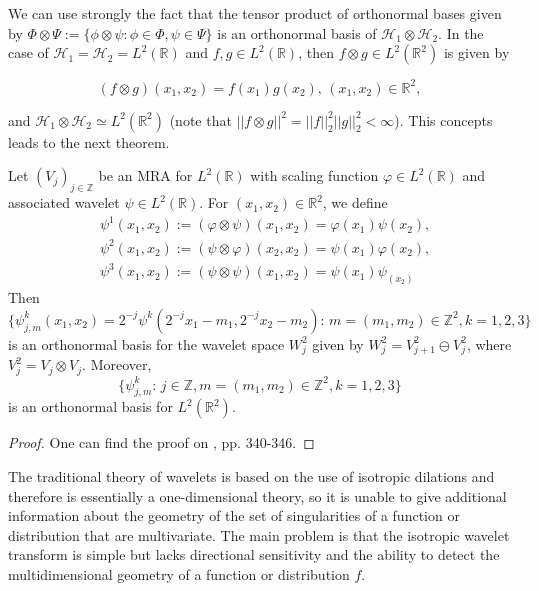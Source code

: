 \bigskip

We can use strongly the fact that the tensor product of orthonormal bases given by $\Phi\otimes\Psi:=\{\phi\otimes\psi:\phi\in\Phi,\psi\in\Psi\}$ is an orthonormal basis of $\mathcal{H}_1\otimes\mathcal{H}_2$. In the case of $\mathcal{H}_1=\mathcal{H}_2=L^2(\mathbb{R})$ and $f,g\in L^2(\mathbb{R})$, then $f\otimes g\in L^2(\mathbb{R}^2)$ is given by

$$
(f\otimes g)(x_1,x_2)=f(x_1)g(x_2)\text{,  } (x_1,x_2)\in\mathbb{R}^2,
$$

and $\mathcal{H}_1\otimes\mathcal{H}_2\simeq L^2(\mathbb{R}^2)$ (note that $||f\otimes g||^2=||f||_2^2||g||_2^2<\infty$). This concepts leads to the next theorem.

\bigskip

\begin{thm}
Let $(V_j)_{j\in\mathbb{Z}}$ be an MRA for $L^2(\mathbb{R})$ with scaling function $\varphi\in L^2(\mathbb{R})$ and associated wavelet $\psi\in L^2(\mathbb{R})$. For $(x_1,x_2)\in\mathbb{R}^2$, we define
$$
\begin{aligned}
&\psi^1(x_1,x_2):=(\varphi\otimes\psi)(x_1,x_2)=\varphi(x_1)\psi(x_2),\\
&\psi^2(x_1,x_2):=(\psi\otimes\varphi)(x_2,x_2)=\psi(x_1)\varphi(x_2),\\
&\psi^3(x_1,x_2):=(\psi\otimes\psi)(x_1,x_2)=\psi(x_1)\psi_(x_2)
\end{aligned}
$$
Then 
$$
\{\psi_{j,m}^k(x_1,x_2)=2^{-j}\psi^k(2^{-j}x_1-m_1,2^{-j}x_2-m_2)\text{: } m=(m_1,m_2)\in\mathbb{Z}^2,k=1,2,3\}
$$
is an orthonormal basis for the wavelet space $W^2_j$ given by $ W^2_j=V^2_{j+1}\ominus V^2_j$, where $V^2_j=V_j\otimes V_j$. Moreover,
$$
\{\psi_{j,m}^k\text{:  }j\in\mathbb{Z},m=(m_1,m_2)\in\mathbb{Z}^2,k=1,2,3\}
$$
is an orthonormal basis for $L^2(\mathbb{R}^2)$.
\end{thm}
\begin{proof}
One can find the proof on \cite{Mallat}, pp. 340-346.
\end{proof}

\bigskip

The traditional theory of wavelets is based on the use of isotropic dilations and therefore is essentially a one-dimensional theory, so it is unable to give additional information about the geometry of the set of singularities of a function or distribution that are multivariate. The main problem is that the isotropic wavelet transform is simple but lacks directional sensitivity and the ability to detect the multidimensional geometry of a function or distribution $f$.

